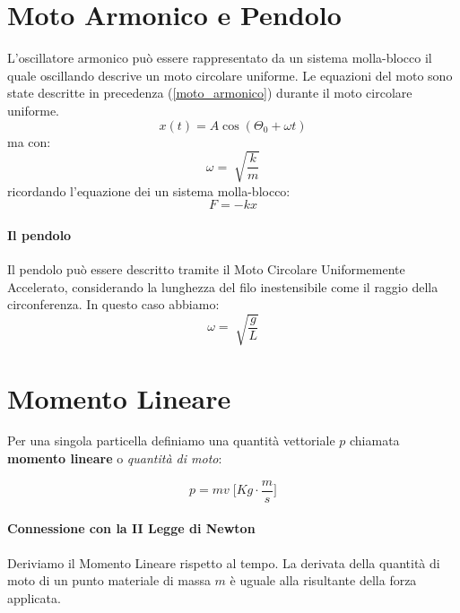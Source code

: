     \section{Moto Armonico e Pendolo} L'oscillatore armonico può essere 
    rappresentato da un sistema molla-blocco il quale oscillando descrive un 
    moto circolare uniforme. Le equazioni del moto sono state descritte in 
    precedenza (\ref{moto_armonico}) durante il moto circolare uniforme. 
        \begin{equation}
            x(t) = A \cos(\Theta_0 + \omega t)
        \end{equation}
        ma con:
        \begin{equation*}
            \omega = \sqrt[]{\frac{k}{m}}
        \end{equation*}
        ricordando l'equazione dei un sistema molla-blocco:
        \begin{equation*}
            F = -kx
        \end{equation*}
        
        \paragraph{Il pendolo} Il pendolo può essere descritto tramite il
        Moto Circolare Uniformemente Accelerato, considerando la lunghezza del 
        filo inestensibile come il raggio della circonferenza. In questo caso 
        abbiamo:
        \begin{equation*}
            \omega = \sqrt[]{\frac{g}{L}}
        \end{equation*}
    
\newpage
    
    \section{Momento Lineare}
    Per una singola particella definiamo una quantità vettoriale $p$ chiamata
    \textbf{momento lineare} o \textit{quantità di moto}: 

        \begin{equation}
            p = mv \; \Bigg[Kg \cdot \frac{m}{s}\Bigg] 
        \end{equation}

        \paragraph{Connessione con la II Legge di Newton} Deriviamo il 
        Momento Lineare rispetto al tempo. La derivata della quantità di moto 
        di un punto materiale di massa $m$ è uguale alla risultante della forza 
        applicata.

